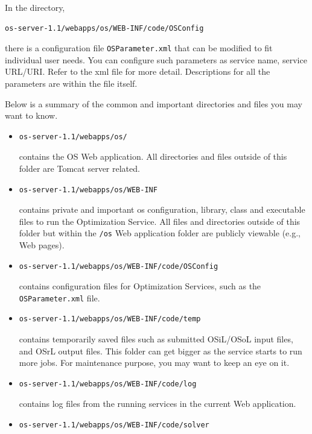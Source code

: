 \documentclass[11pt]{article}
\renewcommand{\_}{{\char"5F}}
\renewcommand{\{}{{\char"7B}}
\renewcommand{\}}{{\char"7D}}
\renewcommand{\^}{{\char"0D}}
\renewcommand{\'}{{\char"0D}}
\begin{document}
\begin{enumerate}[Step 1:]
In the directory,
\begin{verbatim}
os-server-1.1/webapps/os/WEB-INF/code/OSConfig
\end{verbatim}
there is a configuration file {\tt OSParameter.xml} that can be modified to fit individual user needs. You can configure such parameters as service name, service URL/URI. Refer to the xml file for more detail. Descriptions for all the parameters are within the file itself.

\vskip 8pt

Below is a summary of the common and important directories and files you may want to know.

\begin{itemize}
\item
\begin{verbatim}
os-server-1.1/webapps/os/
\end{verbatim}
contains the OS Web application. All directories and files outside of this folder are Tomcat server related.
\item
\begin{verbatim}
os-server-1.1/webapps/os/WEB-INF
\end{verbatim}
contains private and important os configuration, library, class and executable files to run the Optimization Service. 
All files and directories outside of this folder but within the {\tt /os} Web application folder are publicly viewable (e.g., Web pages).
\item
\begin{verbatim}
os-server-1.1/webapps/os/WEB-INF/code/OSConfig
\end{verbatim}
contains configuration files for Optimization Services, such as the {\tt OSParameter.xml} file.
\item
\begin{verbatim}
os-server-1.1/webapps/os/WEB-INF/code/temp
\end{verbatim}
contains temporarily saved files such as submitted OSiL/OSoL input files, and OSrL output files. This folder can get bigger as the service starts to run more jobs. For maintenance purpose, you may want to keep an eye on it.
\item
\begin{verbatim}
os-server-1.1/webapps/os/WEB-INF/code/log
\end{verbatim}
contains log files from the running services in the current Web application.
\item
\begin{verbatim}
os-server-1.1/webapps/os/WEB-INF/code/solver

\end{verbatim}
\end{itemize}
\end{enumerate}
\end{document}
